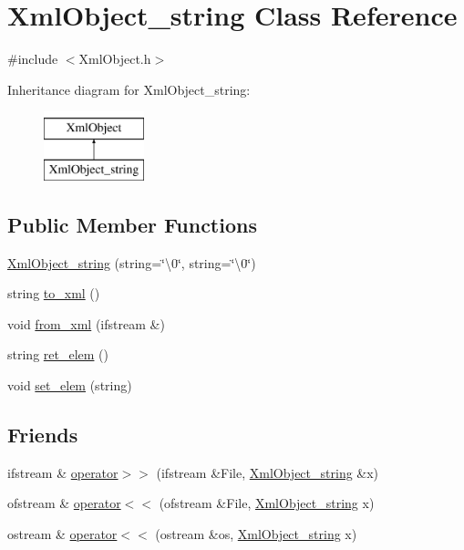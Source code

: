 \hypertarget{classXmlObject__string}{\section{Xml\-Object\-\_\-string Class Reference}
\label{classXmlObject__string}
}


{\ttfamily \#include $<$Xml\-Object.\-h$>$}

Inheritance diagram for Xml\-Object\-\_\-string\-:\begin{figure}[H]
\begin{center}
\leavevmode
\includegraphics[height=2.000000cm]{classXmlObject__string}
\end{center}
\end{figure}
\subsection*{Public Member Functions}
\begin{DoxyCompactItemize}
\item 
\hyperlink{classXmlObject__string_af8235aac95dee8af1d4ad9f058865948}{Xml\-Object\-\_\-string} (string=\char`\"{}\textbackslash{}0\char`\"{}, string=\char`\"{}\textbackslash{}0\char`\"{})
\item 
string \hyperlink{classXmlObject__string_aea62ae01f9fbbe6718c7269d9dc0591f}{to\-\_\-xml} ()
\item 
void \hyperlink{classXmlObject__string_a45076d31e063208d1386741f2e1074d3}{from\-\_\-xml} (ifstream \&)
\item 
string \hyperlink{classXmlObject__string_a14cc967eb78c9293c49055d54d602717}{ret\-\_\-elem} ()
\item 
void \hyperlink{classXmlObject__string_a41323b0a911aab6145da0ec527329c4a}{set\-\_\-elem} (string)
\end{DoxyCompactItemize}
\subsection*{Friends}
\begin{DoxyCompactItemize}
\item 
ifstream \& \hyperlink{classXmlObject__string_a5790a0bb79553d3597a8498aaf8118a2}{operator$>$$>$} (ifstream \&File, \hyperlink{classXmlObject__string}{Xml\-Object\-\_\-string} \&x)
\item 
ofstream \& \hyperlink{classXmlObject__string_acf1a3de06b876cac2c8b5ae510d13620}{operator$<$$<$} (ofstream \&File, \hyperlink{classXmlObject__string}{Xml\-Object\-\_\-string} x)
\item 
ostream \& \hyperlink{classXmlObject__string_a47a42d8624b5b6ce6252d2cf6a815b8a}{operator$<$$<$} (ostream \&os, \hyperlink{classXmlObject__string}{Xml\-Object\-\_\-string} x)
\end{DoxyCompactItemize}
